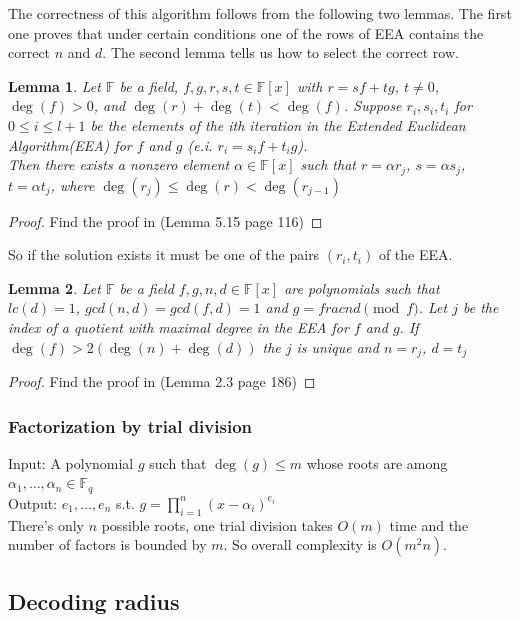 \documentclass[12pt]{article}
\newtheorem{lemma}{Lemma}
\begin{document}
The correctness of this algorithm follows from the following two lemmas. The first one proves that under certain conditions one of the rows of EEA contains the correct $n$ and $d$. The second lemma tells us how to select the correct row.

\begin{lemma}
Let $\mathbb{F}$ be a field, $f, g, r, s, t \in \mathbb{F}[x]$ with $r = sf + tg$, $t \neq 0$, $\deg(f) > 0$, and $\deg(r) + \deg(t) <\deg(f)$.
Suppose $r_i, s_i, t_i$ for $0 \leq i \leq l + 1$ be the elements of the ith iteration in the Extended Euclidean Algorithm(EEA) for $f$ and $g$ (e.i. $r_i = s_if + t_ig$). \\
Then there exists a nonzero element $\alpha \in \mathbb{F}[x]$ such that $r = \alpha r_j$, $s = \alpha s_j$, $t = \alpha t_j$, where $\deg(r_j) \leq \deg(r) < \deg(r_{j-1})$
\end{lemma}
\begin{proof}
Find the proof in \cite{[GG13]} (Lemma 5.15 page 116)
\end{proof}

So if the solution exists it must be one of the pairs $(r_i, t_i)$ of the EEA.

\begin{lemma}
Let $\mathbb{F}$ be a field $f,g,n,d \in \mathbb{F}[x]$ are polynomials such that $lc(d) = 1$, $gcd(n,d) = gcd(f,d) = 1$ and $g = frac{n}{d} \pmod{f}$. Let $j$ be the index of a quotient with maximal degree in the EEA for $f$ and $g$. If $\deg(f) > 2(\deg(n) + \deg(d))$ the $j$ is unique and $n = r_j$, $d = t_j$
\end{lemma}
\begin{proof}
Find the proof in \cite{[KM06]} (Lemma 2.3 page 186)
\end{proof}


\subsubsection{Factorization by trial division}
\label{subsubsec:factoring_polynomials}
Input: A polynomial $g$ such that $\deg(g) \leq m$ whose roots are among $\alpha_1, \dots , \alpha_n \in \mathbb{F}_q$\\
Output: $e_1, \dots , e_n$ s.t. $g = \prod_{i = 1}^{n}(x - \alpha_i)^{e_i}$\\
There's only $n$ possible roots, one trial division takes $O(m)$ time and the number of factors is bounded by $m$. So overall complexity is $O(m^2n)$.


\subsection{Decoding radius}
\label{subsec:radius_polynomials}
\end{document}

